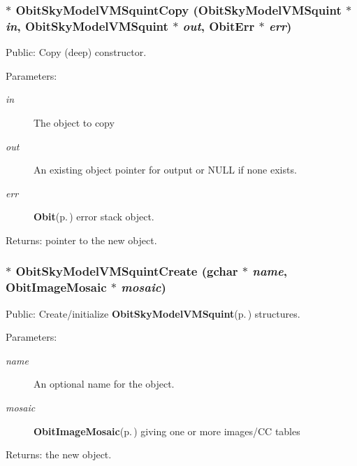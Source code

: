 \subsubsection{$\ast$ Obit\-Sky\-Model\-VMSquint\-Copy ({\bf Obit\-Sky\-Model\-VMSquint} $\ast$ {\em in}, {\bf Obit\-Sky\-Model\-VMSquint} $\ast$ {\em out}, {\bf Obit\-Err} $\ast$ {\em err})}\label{ObitSkyModelVMSquint_8c_a17}


Public: Copy (deep) constructor. 

\begin{Desc}
\item[Parameters:]
\begin{description}
\item[{\em in}]The object to copy \item[{\em out}]An existing object pointer for output or NULL if none exists. \item[{\em err}]{\bf Obit}{\rm (p.\,\pageref{structObit})} error stack object. \end{description}
\end{Desc}
\begin{Desc}
\item[Returns:]pointer to the new object. \end{Desc}
\subsubsection{$\ast$ Obit\-Sky\-Model\-VMSquint\-Create (gchar $\ast$ {\em name}, {\bf Obit\-Image\-Mosaic} $\ast$ {\em mosaic})}\label{ObitSkyModelVMSquint_8c_a18}


Public: Create/initialize {\bf Obit\-Sky\-Model\-VMSquint}{\rm (p.\,\pageref{structObitSkyModelVMSquint})} structures. 

\begin{Desc}
\item[Parameters:]
\begin{description}
\item[{\em name}]An optional name for the object. \item[{\em mosaic}]{\bf Obit\-Image\-Mosaic}{\rm (p.\,\pageref{structObitImageMosaic})} giving one or more images/CC tables \end{description}
\end{Desc}
\begin{Desc}
\item[Returns:]the new object. \end{Desc}
